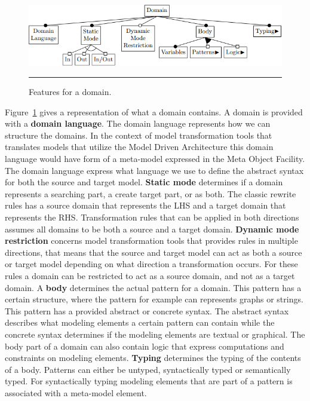 \begin{figure}[H]
  \centering
    \includegraphics[scale=0.65]{./Figures/Domain_1.png}
    \rule{35em}{0.5pt}
  \caption[Feature diagram a domain]
  {Features for a domain.}
  \label{fig:Domain}
\end{figure}

Figure~\ref{fig:Domain} gives a representation of what a domain contains. A
domain is provided with a \textbf{domain language}. The domain language
represents how we can structure the domains. In the context of model
transformation tools that translates models that utilize the Model Driven
Architecture this domain language would have form of a meta-model expressed in
the Meta Object Facility. The domain language express what language we use to
define the abstract syntax for both the source and target model. \textbf{Static
mode} determines if a domain represents a searching part, a create target part, 
or as both. The classic rewrite rules has a source domain that represents the
LHS and a target domain that represents the RHS. Transformation rules that can
be applied in both directions assumes all domains to be both a source and a
target domain. \textbf{Dynamic mode restriction} concerns model transformation
tools that provides rules in multiple directions, that means that the source
and target model can act as both a source or target model depending on what
direction a transformation occurs. For these rules a domain can be restricted to
act as a source domain, and not as a target domain. A \textbf{body} determines
the actual pattern for a domain. This pattern has a certain structure, where the
pattern for example can represents graphs or strings. This pattern has a
provided abstract or concrete syntax. The abstract syntax describes what
modeling elements a certain pattern can contain while the concrete syntax
determines if the modeling elements are textual or graphical. The body part of a
domain can also contain logic that express computations and constraints on
modeling elements. \textbf{Typing} determines the typing of the contents of a
body. Patterns can either be untyped, syntactically typed or semantically typed.
For syntactically typing modeling elements that are part of a pattern is
associated with a meta-model element.  

